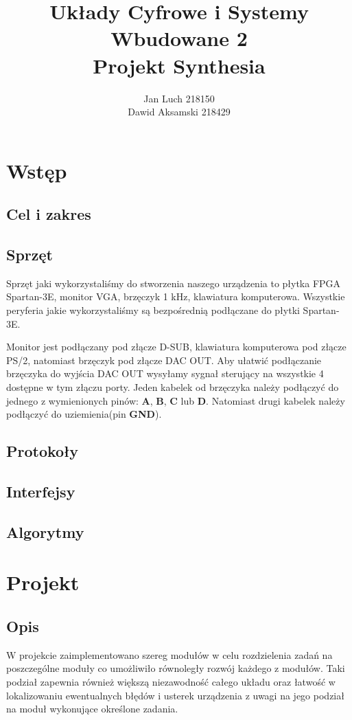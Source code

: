 \documentclass[a4paper]{report}
\title{\huge Układy Cyfrowe i Systemy Wbudowane 2\\Projekt Synthesia}
\date{} %
\author{Jan Luch\hspace{42pt} 218150  \\Dawid Aksamski\hspace{5pt} 218429}
\begin{document}
\frenchspacing
{}
\maketitle
\newpage

\tableofcontents
\newpage


\chapter{Wstęp}
	\section{Cel i zakres}
	\section{Sprzęt}
		\par Sprzęt jaki wykorzystaliśmy do stworzenia naszego urządzenia to płytka FPGA Spartan-3E, 
		monitor VGA, brzęczyk 1 kHz, klawiatura komputerowa. Wszystkie peryferia jakie wykorzystaliśmy
		są bezpośrednią podłączane do płytki Spartan-3E.
		\par Monitor jest podłączany pod złącze D-SUB, 
		klawiatura komputerowa pod złącze PS/2, natomiast brzęczyk pod złącze DAC OUT. Aby ułatwić 
		podłączanie brzęczyka do wyjścia DAC OUT wysyłamy sygnał sterujący na wszystkie 4 dostępne w tym 
		złączu porty. Jeden kabelek od brzęczyka należy podłączyć do jednego z wymienionych pinów: \textbf{A},
		\textbf{B}, \textbf{C} lub \textbf{D}. Natomiast drugi kabelek należy podłączyć do uziemienia(pin \textbf{GND}).
	\section{Protokoły}
	\section{Interfejsy}
	\section{Algorytmy}

\chapter{Projekt}
	\section{Opis}
	W projekcie zaimplementowano szereg modułów w celu rozdzielenia zadań na poszczególne moduły
	co umożliwiło równoległy rozwój każdego z modułów. Taki podział zapewnia również większą
	niezawodność całego układu oraz łatwość w lokalizowaniu ewentualnych błędów i 
	usterek urządzenia z uwagi na jego podział na moduł wykonujące określone zadania.
\end{document}
